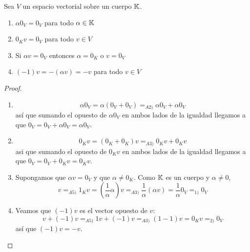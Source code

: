 \begin{lemma}
	Sea \(V \) un espacio vectorial sobre un cuerpo \(\mathbb{K} \).
	\begin{enumerate}
		\item \(\alpha 0_V = 0_V \) para todo \(\alpha \in \mathbb{K} \)
		\item \(0_K v = 0_V \) para todo \(v \in V \)
		\item Si \(\alpha v = 0_V \) entonces \(\alpha = 0_K \) o \(v = 0_V \)
		\item \((-1)v = - (\alpha v) = -v \) para todo \(v \in V \)
	\end{enumerate}
\end{lemma}
\begin{proof}
	\begin{enumerate}
		\item
		      \[
			      \alpha 0_V = \alpha (0_V + 0_V) =_{A2)} \alpha 0_V + \alpha 0_V
		      \]
		      así que sumando el opuesto de \(\alpha 0_V \) en ambos lados de la igualdad llegamos a que \(0_V = 0_V + \alpha 0_V = \alpha 0_V \).
		\item
		      \[
			      0_K v = (0_K + 0_K) v =_{A3)} 0_K v + 0_K v
		      \]
		      asi que sumando el opuesto de \(0_K v \) en ambos lados de la igualdad llegamos a que \(0_V = 0_V + 0_K v = 0_K v \).
		\item Supongamos que \(\alpha v = 0_V \) y que \(\alpha \neq 0_K \). Como \(\mathbb{K} \) es un cuerpo y \(\alpha \neq 0 \),
		      \[
			      v =_{A5)} 1_K v = (\frac{1}{\alpha} \alpha) v =_{A3)} \frac{1}{\alpha} (\alpha v) = \frac{1}{\alpha} 0_V =_{1)} 0_V
		      \]
		\item Veamos que \((-1)v \) es el vector opuesto de \(v \):
		      \[
			      v + (-1)v =_{A5)} 1v + (-1)v =_{A3)} (1-1) v = 0_K v =_{2)} 0_V
		      \]
		      así que \((-1)v = -v \).
	\end{enumerate}
\end{proof}

